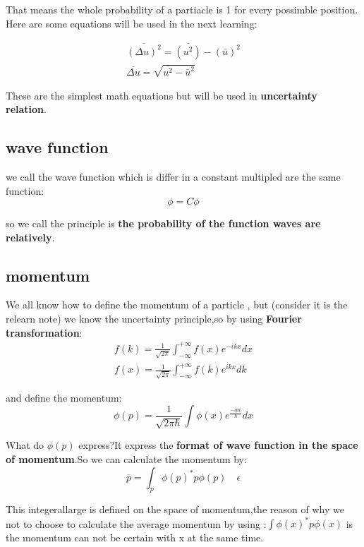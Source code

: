 \documentclass{article}
\begin{document}
That means the whole probability of a partiacle is 1 for every possimble position.
Here are some equations will be used in the next learning:

\begin{align}
\overline{(\Delta u)^2} =\overline{( u^2)}-(\bar u)^2  \\
\overline{\Delta u}=\sqrt{\overline{u^2}-{\bar u}^2}
\end{align}

These are the simplest math equations but will be used in \textbf{uncertainty relation}.

\subsection{wave function}

we call the wave function which is differ in a constant multipled are the same function:
\begin{equation}
\phi=C\phi
\end{equation}

so we call the principle is \textbf{the probability of the function waves are relatively}.

\subsection{momentum}

We all know how to define the momentum of a particle , but (consider it is the relearn note) we know the uncertainty principle,so by using \textbf{Fourier transformation}:
\begin{align}
  f(k)=\frac1{\sqrt {2\pi}}\int ^{+\infty}_{-\infty}f(x)e^{-ikx} dx \\
  f(x)=\frac1{\sqrt {2\pi}}\int ^{+\infty}_{-\infty}f(k)e^{ikx} dk 
\end{align}

and define the momentum:
\begin{equation}
  \phi(p)=\frac1{\sqrt{2\pi\hbar}}\int \phi(x)e^{\frac{-ipx}{\hbar}}dx
\end{equation}

What do $\phi(p)$ express?It express the \textbf{format of wave function in the space of momentum}.So we can calculate the momentum by:
\begin{equation}
  \overline p=\int_{p} \phi(p)^*p\phi(p)\quad\epsilon
\end{equation}

This integerallarge is defined on the space of momentum,the reason of why we not to choose to calculate the average momentum by using :$\int \phi(x)^*p\phi(x)$ is the momentum can not be certain with x at the same time.
\end{document}
